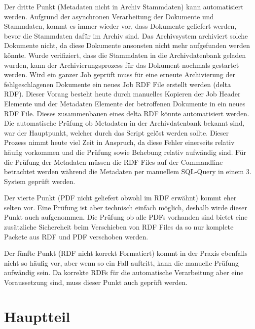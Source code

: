 \documentclass[a4paper,oneside, 12pt]{report}
\begin{document}
Der dritte Punkt (Metadaten nicht in Archiv Stammdaten) kann automatisiert werden. Aufgrund der asynchronen Verarbeitung der Dokumente und Stammdaten, kommt es immer wieder vor, dass Dokumente geliefert werden, bevor die Stammdaten dafür im Archiv sind. Das Archivsystem archiviert solche Dokumente nicht, da diese Dokumente ansonsten nicht mehr aufgefunden werden könnte. Wurde verifiziert, dass die Stammdaten in die Archivdatenbank geladen wurden, kann der Archivierungsprozess für das Dokument nochmals gestartet werden. Wird ein ganzer Job geprüft muss für eine erneute Archivierung der fehlgeschlagenen Dokumente ein neues Job RDF File erstellt werden (delta RDF). Dieser Vorang besteht heute durch manuelles Kopieren der Job Header Elemente und der Metadaten Elemente der betroffenen Dokumente in ein neues RDF File. Dieses zusammenbauen eines delta RDF könnte automatisiert werden.
Die automatische Prüfung ob Metadaten in der Archivdatenbank bekannt sind, war der Hauptpunkt, welcher durch das Script gelöst werden sollte. Dieser Prozess nimmt heute viel Zeit in Anspruch, da diese Fehler einerseits relativ häufig vorkommen und die Prüfung sowie Behebung relativ aufwändig sind. Für die Prüfung der Metadaten müssen die RDF Files auf der Commandline betrachtet werden während die Metadaten per manuellem SQL-Query in einem 3. System geprüft werden.

Der vierte Punkt (PDF nicht geliefert obwohl im RDF erwähnt) kommt eher selten vor. Eine Prüfung ist aber technisch einfach möglich, deshalb wirde dieser Punkt auch aufgenommen. Die Prüfung ob alle PDFs vorhanden sind bietet eine zusätzliche Sichereheit beim Verschieben von RDF Files da so nur komplete Packete aus RDF und PDF verschoben werden.

Der fünfte Punkt (RDF nicht korrekt Formatiert) kommt in der Praxis ebenfalls nicht so häufig vor, aber wenn so ein Fall auftritt, kann die manuelle Prüfung aufwändig sein. Da korrekte RDFs für die automatische Verarbeitung aber eine Voraussetzung sind, muss dieser Punkt auch geprüft werden.

\chapter{Hauptteil}\label{sec:motivation}
\end{document}
